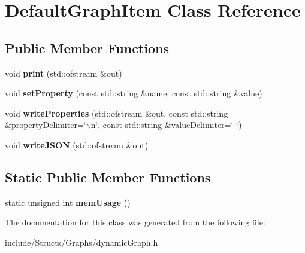 \hypertarget{class_default_graph_item}{
\section{DefaultGraphItem Class Reference}
\label{class_default_graph_item}
}
\subsection*{Public Member Functions}
\begin{DoxyCompactItemize}
\item 
\hypertarget{class_default_graph_item_ad91150420ed5529ed4c6c9f81b25aa0a}{
void {\bfseries print} (std::ofstream \&out)}
\label{class_default_graph_item_ad91150420ed5529ed4c6c9f81b25aa0a}

\item 
\hypertarget{class_default_graph_item_a96fcdf99086145bf61f96345f4eb49ab}{
void {\bfseries setProperty} (const std::string \&name, const std::string \&value)}
\label{class_default_graph_item_a96fcdf99086145bf61f96345f4eb49ab}

\item 
\hypertarget{class_default_graph_item_a8f22fb2dfbb578a03c6fe91eb74e7569}{
void {\bfseries writeProperties} (std::ofstream \&out, const std::string \&propertyDelimiter=\char`\"{}$\backslash$n\char`\"{}, const std::string \&valueDelimiter=\char`\"{} \char`\"{})}
\label{class_default_graph_item_a8f22fb2dfbb578a03c6fe91eb74e7569}

\item 
\hypertarget{class_default_graph_item_a3beecc39d57b864050547093ed1e013f}{
void {\bfseries writeJSON} (std::ofstream \&out)}
\label{class_default_graph_item_a3beecc39d57b864050547093ed1e013f}

\end{DoxyCompactItemize}
\subsection*{Static Public Member Functions}
\begin{DoxyCompactItemize}
\item 
\hypertarget{class_default_graph_item_af66967d62134fa0d89d000828d76505d}{
static unsigned int {\bfseries memUsage} ()}
\label{class_default_graph_item_af66967d62134fa0d89d000828d76505d}

\end{DoxyCompactItemize}


The documentation for this class was generated from the following file:\begin{DoxyCompactItemize}
\item 
include/Structs/Graphs/dynamicGraph.h\end{DoxyCompactItemize}
